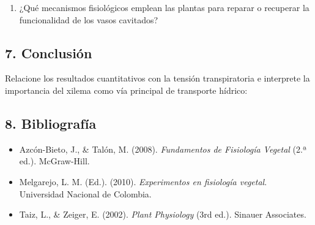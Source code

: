 \documentclass[
  spanish,
  10pt,
  letterpaper,
  twocolumn]{article}
\providecommand{\tightlist}{%
  \setlength{\itemsep}{0pt}\setlength{\parskip}{0pt}}
\begin{document}
\hrulefill

\hrulefill

\hrulefill

\hrulefill

\hrulefill

\hrulefill

\hrulefill

\hrulefill

\begin{enumerate}
\def\labelenumi{\arabic{enumi}.}
\setcounter{enumi}{2}
\tightlist
\item
  ¿Qué mecanismos fisiológicos emplean las plantas para reparar o
  recuperar la funcionalidad de los vasos cavitados?
\end{enumerate}

\hrulefill

\hrulefill

\hrulefill

\hrulefill

\hrulefill

\hrulefill

\hrulefill

\hrulefill

\subsection{7. Conclusión}\label{conclusiuxf3n}

Relacione los resultados cuantitativos con la tensión transpiratoria e
interprete la importancia del xilema como vía principal de transporte
hídrico:

\hrulefill

\hrulefill

\hrulefill

\hrulefill

\hrulefill

\hrulefill

\hrulefill

\subsection{8. Bibliografía}\label{bibliografuxeda}

\begin{itemize}
\tightlist
\item
  Azcón-Bieto, J., \& Talón, M. (2008). \emph{Fundamentos de Fisiología
  Vegetal} (2.ª ed.). McGraw-Hill.
\item
  Melgarejo, L. M. (Ed.). (2010). \emph{Experimentos en fisiología
  vegetal}. Universidad Nacional de Colombia.
\item
  Taiz, L., \& Zeiger, E. (2002). \emph{Plant Physiology} (3rd ed.).
  Sinauer Associates.
\end{itemize}
\end{document}
